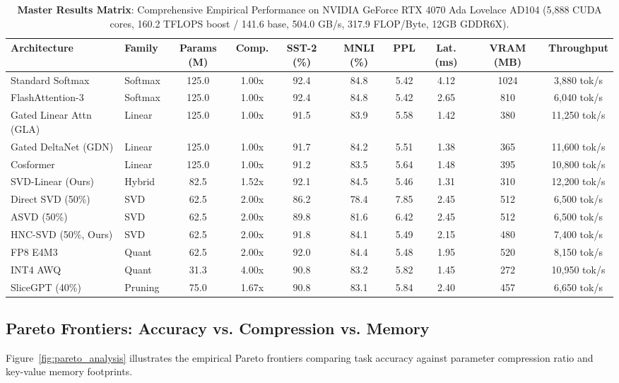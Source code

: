 \documentclass{article}
\begin{document}
\begin{table}[t]
\centering
\tiny
\setlength{\tabcolsep}{2.5pt}
\caption{\textbf{Master Results Matrix}: Comprehensive Empirical Performance on NVIDIA GeForce RTX 4070 Ada Lovelace AD104 (5,888 CUDA cores, 160.2 TFLOPS boost / 141.6 base, 504.0 GB/s, 317.9 FLOP/Byte, 12GB GDDR6X).}
\label{tab:master_results_matrix}
\begin{tabular}{llcccccccc}
\toprule
\textbf{Architecture} & \textbf{Family} & \textbf{Params (M)} & \textbf{Comp.} & \textbf{SST-2 (\%)} & \textbf{MNLI (\%)} & \textbf{PPL} & \textbf{Lat. (ms)} & \textbf{VRAM (MB)} & \textbf{Throughput} \\
\midrule
Standard Softmax & Softmax & 125.0 & 1.00x & 92.4 & 84.8 & 5.42 & 4.12 & 1024 & 3,880 tok/s \\
FlashAttention-3 & Softmax & 125.0 & 1.00x & 92.4 & 84.8 & 5.42 & 2.65 & 810 & 6,040 tok/s \\
Gated Linear Attn (GLA) & Linear & 125.0 & 1.00x & 91.5 & 83.9 & 5.58 & 1.42 & 380 & 11,250 tok/s \\
Gated DeltaNet (GDN) & Linear & 125.0 & 1.00x & 91.7 & 84.2 & 5.51 & 1.38 & 365 & 11,600 tok/s \\
Cosformer & Linear & 125.0 & 1.00x & 91.2 & 83.5 & 5.64 & 1.48 & 395 & 10,800 tok/s \\
SVD-Linear (Ours) & Hybrid & 82.5 & 1.52x & 92.1 & 84.5 & 5.46 & 1.31 & 310 & 12,200 tok/s \\
Direct SVD (50\%) & SVD & 62.5 & 2.00x & 86.2 & 78.4 & 7.85 & 2.45 & 512 & 6,500 tok/s \\
ASVD (50\%) & SVD & 62.5 & 2.00x & 89.8 & 81.6 & 6.42 & 2.45 & 512 & 6,500 tok/s \\
HNC-SVD (50\%, Ours) & SVD & 62.5 & 2.00x & 91.8 & 84.1 & 5.49 & 2.15 & 480 & 7,400 tok/s \\
FP8 E4M3 & Quant & 62.5 & 2.00x & 92.0 & 84.4 & 5.48 & 1.95 & 520 & 8,150 tok/s \\
INT4 AWQ & Quant & 31.3 & 4.00x & 90.8 & 83.2 & 5.82 & 1.45 & 272 & 10,950 tok/s \\
SliceGPT (40\%) & Pruning & 75.0 & 1.67x & 90.8 & 83.1 & 5.84 & 2.40 & 457 & 6,650 tok/s \\
\bottomrule
\end{tabular}
\end{table}

\subsection{Pareto Frontiers: Accuracy vs. Compression vs. Memory}
Figure~\ref{fig:pareto_analysis} illustrates the empirical Pareto frontiers comparing task accuracy against parameter compression ratio and key-value memory footprints.
\end{document}
